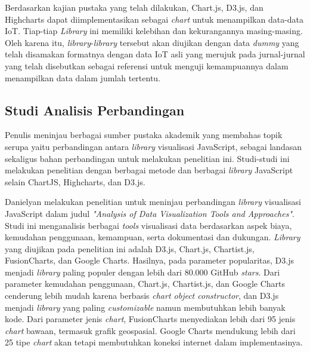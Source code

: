 Berdasarkan kajian pustaka yang telah dilakukan, Chart.js, D3.js, dan Highcharts dapat diimplementasikan sebagai \textit{chart} untuk menampilkan data-data IoT. Tiap-tiap \textit{Library} ini memiliki kelebihan dan kekurangannya masing-masing. Oleh karena itu, \textit{library}-\textit{library} tersebut akan diujikan dengan data \textit{dummy} yang telah disamakan formatnya dengan data IoT asli yang merujuk pada jurnal-jurnal yang telah disebutkan sebagai referensi untuk menguji kemampuannya dalam menampilkan data dalam jumlah tertentu. 

\subsection{Studi Analisis Perbandingan}
Penulis meninjau berbagai sumber pustaka akademik yang membahas topik serupa yaitu perbandingan antara \textit{library} visualisasi JavaScript, sebagai landasan sekaligus bahan perbandingan untuk melakukan penelitian ini. Studi-studi ini melakukan penelitian dengan berbagai metode dan berbagai \textit{library} JavaScript selain ChartJS, Highcharts, dan D3.js. 

Danielyan \cite{Danielyan2018} melakukan penelitian untuk meninjau perbandingan \textit{library} visualisasi JavaScript dalam judul \textit{"Analysis of Data Visualization Tools and Approaches"}. Studi ini menganalisis berbagai \textit{tools} visualisasi data berdasarkan aspek biaya, kemudahan penggunaan, kemampuan, serta dokumentasi dan dukungan. \textit{Library} yang diujikan pada penelitian ini adalah D3.js, Chart.js, Chartist.js, FusionCharts, dan Google Charts. Hasilnya, pada  parameter popularitas,  D3.js menjadi \textit{library} paling populer dengan lebih dari 80.000 GitHub \textit{stars}. Dari parameter kemudahan penggunaan, Chart.js, Chartist.js, dan Google Charts cenderung lebih mudah karena berbasis \textit{chart object constructor}, dan D3.js menjadi \textit{library} yang paling \textit{customizable} namun membutuhkan lebih banyak kode. Dari parameter jenis \textit{chart}, FusionCharts menyediakan lebih dari 95 jenis \textit{chart} bawaan, termasuk grafik geospasial. Google Charts mendukung lebih dari 25 tipe \textit{chart} akan tetapi membutuhkan koneksi internet dalam implementasinya. 

